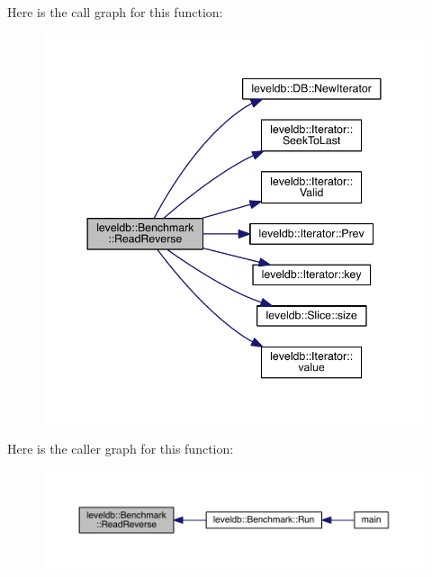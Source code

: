 Here is the call graph for this function\+:\nopagebreak
\begin{figure}[H]
\begin{center}
\leavevmode
\includegraphics[width=344pt]{classleveldb_1_1_benchmark_a0ff7ac14f7503672fd09a23f8cb9c171_cgraph}
\end{center}
\end{figure}




Here is the caller graph for this function\+:\nopagebreak
\begin{figure}[H]
\begin{center}
\leavevmode
\includegraphics[width=350pt]{classleveldb_1_1_benchmark_a0ff7ac14f7503672fd09a23f8cb9c171_icgraph}
\end{center}
\end{figure}


\hypertarget{classleveldb_1_1_benchmark_a301897d0609459c5e6072db05da6b737}{}
